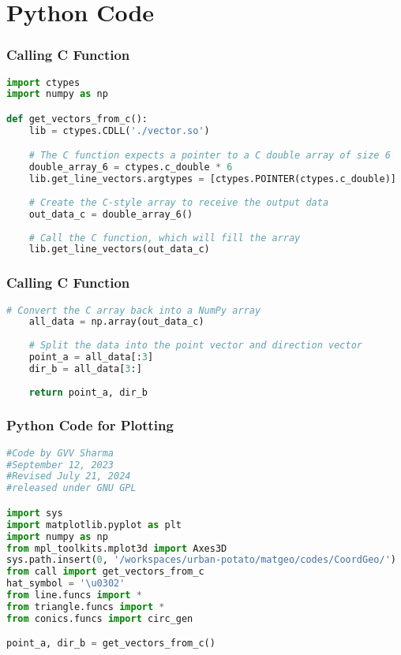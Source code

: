\documentclass{beamer}
\theoremstyle{remark}
\numberwithin{equation}{section}
\begin{document}
\section{Python Code}
\begin{frame}[fragile]
\frametitle{Calling C Function}
\begin{lstlisting}[language=Python]
import ctypes
import numpy as np

def get_vectors_from_c():
    lib = ctypes.CDLL('./vector.so')

    # The C function expects a pointer to a C double array of size 6
    double_array_6 = ctypes.c_double * 6
    lib.get_line_vectors.argtypes = [ctypes.POINTER(ctypes.c_double)]
    
    # Create the C-style array to receive the output data
    out_data_c = double_array_6()
    
    # Call the C function, which will fill the array
    lib.get_line_vectors(out_data_c)
\end{lstlisting}
\end{frame}
\begin{frame}[fragile]
\frametitle{Calling C Function}
\begin{lstlisting}[language=Python]
# Convert the C array back into a NumPy array
    all_data = np.array(out_data_c)
    
    # Split the data into the point vector and direction vector
    point_a = all_data[:3]
    dir_b = all_data[3:]
    
    return point_a, dir_b
    \end{lstlisting}
\end{frame}
\begin{frame}[fragile]
\frametitle{Python Code for Plotting}
\begin{lstlisting}[language=Python]
#Code by GVV Sharma
#September 12, 2023
#Revised July 21, 2024
#released under GNU GPL

import sys
import matplotlib.pyplot as plt
import numpy as np
from mpl_toolkits.mplot3d import Axes3D
sys.path.insert(0, '/workspaces/urban-potato/matgeo/codes/CoordGeo/') 
from call import get_vectors_from_c
hat_symbol = '\u0302'
from line.funcs import *
from triangle.funcs import *
from conics.funcs import circ_gen

point_a, dir_b = get_vectors_from_c()
 
\end{lstlisting}
\end{frame}
\end{document}
